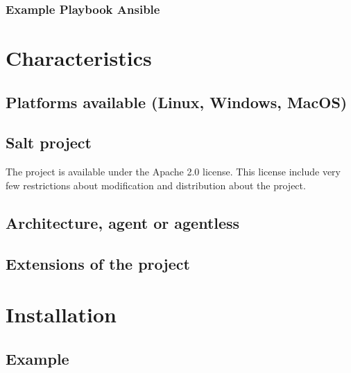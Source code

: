 \documentclass[12pt,a4paper,openright,twoside]{book}
\begin{document}
\subsubsection{Example Playbook Ansible}

\section{Characteristics}

\subsection{Platforms available (Linux, Windows, MacOS)}

\subsection{Salt project}
The project is available under the Apache 2.0 license.
This license include very few restrictions about modification and distribution about the project.

\subsection{Architecture, agent or agentless}


\subsection{Extensions of the project}

\section{Installation}

\subsection{Example}
\end{document}
